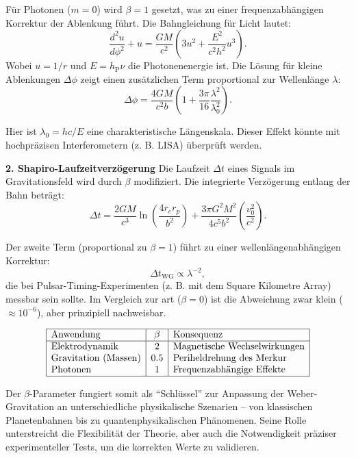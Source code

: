 Für Photonen ($m=0$) wird $\beta=1$ gesetzt, was zu einer frequenzabhängigen Korrektur der Ablenkung führt. Die Bahngleichung für Licht lautet:
\[
\frac{d^2u}{d\phi^2} + u = \frac{GM}{c^2} \left(3u^2 + \frac{E^2}{c^2 h^2} u^3\right).
\]
Wobei $u=1/r$ und $E=h_\text{P}\nu$ die Photonenenergie ist. Die Lösung für kleine Ablenkungen $\Delta\phi$ zeigt einen zusätzlichen Term proportional zur Wellenlänge $\lambda$:
\begin{equation}
\Delta \phi = \frac{4GM}{c^2 b} \left(1 + \frac{3\pi}{16} \frac{\lambda^2}{\lambda_0^2}\right).
\end{equation}

Hier ist $\lambda_0=hc/E$ eine charakteristische Längenskala. Dieser Effekt könnte mit hochpräzisen Interferometern (z. B. LISA) überprüft werden.

\textbf{2. Shapiro-Laufzeitverzögerung}
Die Laufzeit $\Delta t$ eines Signals im Gravitationsfeld wird durch $\beta$ modifiziert. Die integrierte Verzögerung entlang der Bahn beträgt:
\begin{equation}
\Delta t = \frac{2GM}{c^3} \ln\left(\frac{4r_e r_p}{b^2}\right) + \frac{3\pi G^2 M^2}{4c^5 b^2} \left(\frac{v_0^2}{c^2}\right).
\end{equation}

Der zweite Term (proportional zu $\beta=1$) führt zu einer wellenlängenabhängigen Korrektur:
\[
\Delta t_\text{WG} \propto \lambda^{-2},
\]
die bei Pulsar-Timing-Experimenten (z. B. mit dem Square Kilometre Array) messbar sein sollte. Im Vergleich zur \gls{art} ($\beta=0$) ist die Abweichung zwar klein ($\approx 10^{-6}$),
aber prinzipiell nachweisbar.

\[
\begin{array}{|l|c|l|}
\hline
\text{Anwendung} & \beta & \text{Konsequenz} \\
\hline
\text{Elektrodynamik} & 2 & \text{Magnetische Wechselwirkungen} \\
\text{Gravitation (Massen)} & 0.5 & \text{Periheldrehung des Merkur} \\
\text{Photonen} & 1 & \text{Frequenzabhängige Effekte} \\
\hline
\end{array}
\]

Der $\beta$-Parameter fungiert somit als \enquote{Schlüssel} zur Anpassung der Weber-Gravitation an unterschiedliche physikalische Szenarien – von klassischen Planetenbahnen
bis zu quantenphysikalischen Phänomenen. Seine Rolle unterstreicht die Flexibilität der Theorie, aber auch die Notwendigkeit präziser experimenteller Tests, um die korrekten
Werte zu validieren.

